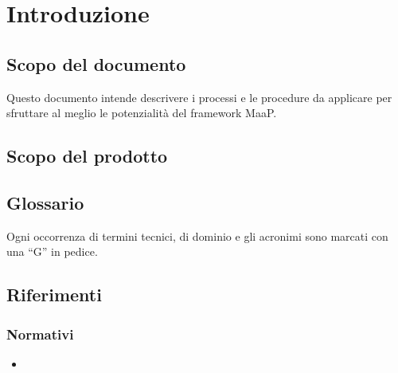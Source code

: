 \section{Introduzione}

	\subsection{Scopo del documento}
	Questo documento intende descrivere i processi e le procedure da applicare per sfruttare al meglio le potenzialità del framework MaaP.

	\subsection{Scopo del prodotto}
	\ScopoDelProdotto

	\subsection{Glossario}
	Ogni occorrenza di termini tecnici, di dominio e gli acronimi sono marcati con una ``G'' in pedice.


	\subsection{Riferimenti}
		\subsubsection{Normativi}
			\begin{itemize}
	  			\item
			\end{itemize}
	

